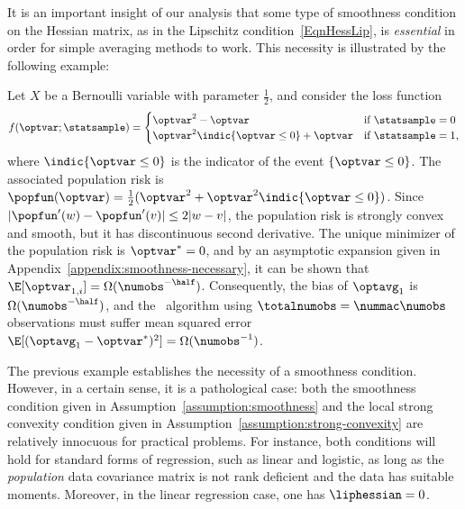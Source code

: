 \documentclass[11pt,twoside]{article}
\theoremstyle{definition}
\begin{document}
It is an important insight of our analysis that some type of
smoothness condition on the Hessian matrix, as in the Lipschitz
condition~\eqref{EqnHessLip}, is \emph{essential} in order for simple
averaging methods to work.  This necessity is illustrated by the
following example:
%
\begin{exam}
Let $X$ be a Bernoulli variable with parameter $\frac{1}{2}$, and
consider the loss function
  \begin{equation}
    \label{eqn:smoothness-loss}
    f(\optvar; \statsample) =
    \begin{cases} \optvar^2 - \optvar &
      \mbox{if}~ \statsample = 0 \\ \optvar^2 \indic{\optvar \leq 0} +
      \optvar & \mbox{if~} \statsample = 1,
    \end{cases}
  \end{equation}
  where $\indic{\optvar \leq 0}$ is the indicator of the
  event $\{ \optvar \leq 0\}$.  The associated population risk is
  $\popfun(\optvar)=\frac{1}{2}(\optvar^2 + \optvar^2 \indic{\optvar
    \leq 0})$.  Since $|\popfun'(w) - \popfun'(v)| \le 2 |w - v|$, the
  population risk is strongly convex and smooth, but it has
  discontinuous second derivative.  The unique minimizer of the
  population risk is $\optvar^* = 0$, and by an asymptotic expansion
  given in Appendix~\ref{appendix:smoothness-necessary}, it can be
  shown that $\E[\optvar_{1,i}] = \Omega(\numobs^{-\half})$.
  Consequently, the bias of $\optavg_1$ is $\Omega(\numobs^{-\half})$,
  and the \avgm\ algorithm using $\totalnumobs = \nummac \numobs$
  observations must suffer mean squared error $\E[(\optavg_1 -
    \optvar^*)^2] = \Omega(\numobs^{-1})$.
\end{exam}

The previous example establishes the necessity of a smoothness
condition.  However, in a certain sense, it is a pathological case:
both the smoothness condition given in
Assumption~\ref{assumption:smoothness} and the local strong convexity
condition given in Assumption~\ref{assumption:strong-convexity} are
relatively innocuous for practical problems.  For instance, both
conditions will hold for standard forms of regression, such as linear
and logistic, as long as the \emph{population} data covariance matrix
is not rank deficient and the data has suitable moments. Moreover, in
the linear regression case, one has $\liphessian = 0$.
\end{document}
